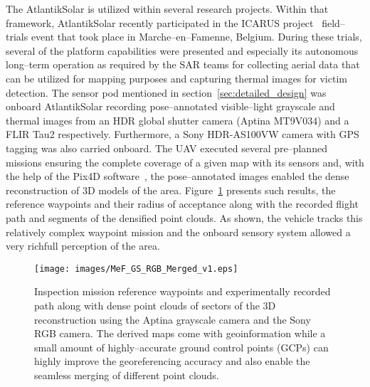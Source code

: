The AtlantikSolar is utilized within several research projects. Within that framework, AtlantikSolar recently participated in the ICARUS project~\cite{ICARUSwebsite} field--trials event that took place in Marche--en--Famenne, Belgium. During these trials, several of the platform capabilities were presented and especially its autonomous long--term operation as required by the SAR teams for collecting aerial data that can be utilized for mapping purposes and capturing thermal images for victim detection. The sensor pod mentioned in section~\ref{sec:detailed_design} was onboard AtlantikSolar recording pose--annotated visible--light grayscale and thermal images from an HDR global shutter camera (Aptina MT9V034) and a FLIR Tau2 respectively. Furthermore, a Sony HDR-AS100VW camera with GPS tagging was also carried onboard. The UAV executed several pre--planned missions ensuring the complete coverage of a given map with its sensors and, with the help of the Pix4D software~\cite{Pix4Dsite}, the pose--annotated images enabled the dense reconstruction of $3\textrm{D}$ models of the area. Figure~\ref{fig:mef_icarus_reconstruction} presents such results, the reference waypoints and their radius of acceptance along with the recorded flight path and segments of the densified point clouds. As shown, the vehicle tracks this relatively complex waypoint mission and the onboard sensory system allowed a very richfull perception of the area.

%
\begin{figure}[htbp]
\begin{center}
  \texttt{[image: images/MeF\_GS\_RGB\_Merged\_v1.eps]} %
\end{center}
\caption{Inspection mission reference waypoints and experimentally recorded path along with dense point clouds of sectors of the $3\textrm{D}$ reconstruction using the Aptina grayscale camera and the Sony RGB camera. The derived maps come with geoinformation while a small amount of highly--accurate ground control points (GCPs) can highly improve the georeferencing accuracy and also enable the seamless merging of different point clouds.  }
\label{fig:mef_icarus_reconstruction}
\end{figure}
%

